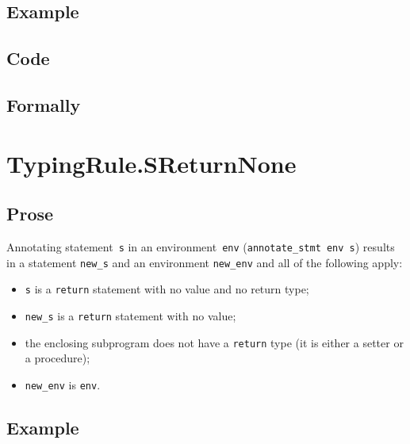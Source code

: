 \documentclass{book}
\begin{document}
  \subsection{Example}

  \subsection{Code}

\begin{emptyformal}
  \subsection{Formally}
\end{emptyformal}


\section{TypingRule.SReturnNone \label{sec:TypingRule.SReturnNone}}

  \subsection{Prose}
Annotating statement~\texttt{s} in an environment~\texttt{env}
(\texttt{annotate\_stmt env s}) results in a statement \texttt{new\_s} and an
environment \texttt{new\_env} and all of the following apply:
   \begin{itemize}
   \item \texttt{s} is a \texttt{return} statement with no value and no return type;
   \item \texttt{new\_s} is a \texttt{return} statement with no value;
   \item the enclosing subprogram does not have a \texttt{return} type (it is either a setter
      or a procedure);
   \item \texttt{new\_env} is \texttt{env}.
   \end{itemize}

  \subsection{Example}
\end{document}
